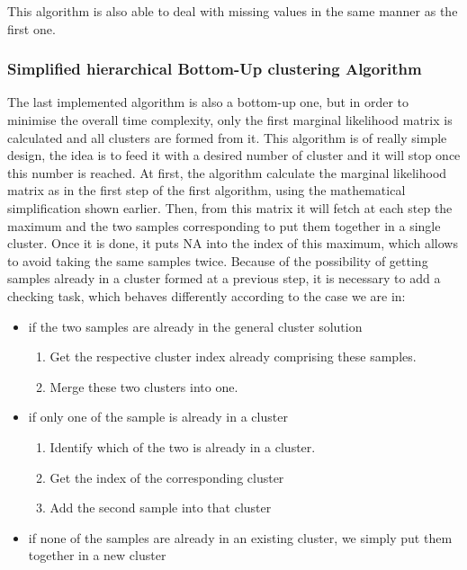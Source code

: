 \documentclass[twocolumn,12pt]{article}
\begin{document}
This algorithm is also able to deal with missing values in the same manner as the first one.

\subsubsection{Simplified hierarchical Bottom-Up clustering Algorithm}

The last implemented algorithm is also a bottom-up one, but in order to minimise the overall time complexity, only the first marginal likelihood matrix is calculated and all clusters are formed from it.
This algorithm is of really simple design, the idea is to feed it with a desired number of cluster and it will stop once this number is reached.
At first, the algorithm calculate the marginal likelihood matrix as in the first step of the first algorithm, using the mathematical simplification shown earlier.
Then, from this matrix it will fetch at each step the maximum and the two samples corresponding to put them together in a single cluster. Once it is done, it puts NA into the index of this maximum, which allows to avoid taking the same samples twice.
Because of the possibility of getting samples already in a cluster formed at a previous step, it is necessary to add a checking task, which behaves differently according to the case we are in:
\begin{itemize}
    \item if the two samples are already in the general cluster solution
        \begin{enumerate}
            \item Get the respective cluster index already comprising these samples.
            \item Merge these two clusters into one.
        \end{enumerate}
    \item if only one of the sample is already in a cluster
        \begin{enumerate}
            \item Identify which of the two is already in a cluster.
            \item Get the index of the corresponding cluster
            \item Add the second sample into that cluster
        \end{enumerate}
    \item if none of the samples are already in an existing cluster, we simply put them together in a new cluster
\end{itemize}
\end{document}
